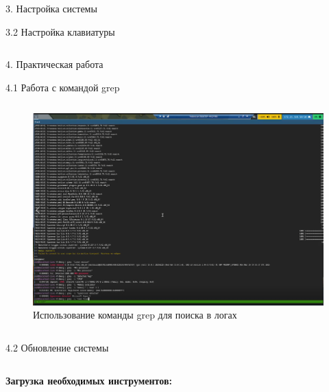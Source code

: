 \documentclass[
  ignorenonframetext,
  aspectratio=169,
  russian,
]{beamer}
\begin{document}
\begin{frame}[fragile]{3. Настройка системы}
\begin{block}{3.2 Настройка клавиатуры}
\begin{columns}[c]
\begin{frame}[fragile]{4. Практическая работа}
\begin{block}{4.1 Работа с командой grep}
\begin{columns}[c]
\begin{column}{0.3\linewidth}
\begin{figure}
{\includegraphics[width=0.8\linewidth,height=\textheight,keepaspectratio]{image/grep.PNG}

}

\caption{\label{fig-grep}Использование команды grep для поиска в логах}

\end{figure}%
\end{column}
\end{columns}
\end{block}

\begin{block}{4.2 Обновление системы}
\label{ux43eux431ux43dux43eux432ux43bux435ux43dux438ux435-ux441ux438ux441ux442ux435ux43cux44b}
\begin{columns}[c]
\begin{column}{0.7\linewidth}
\textbf{Загрузка необходимых инструментов:}
\end{column}

\begin{column}{0.3\linewidth}
\begin{figure}

\end{figure}
\end{column}
\end{columns}
\end{block}
\end{frame}
\end{columns}
\end{block}
\end{frame}
\end{document}
